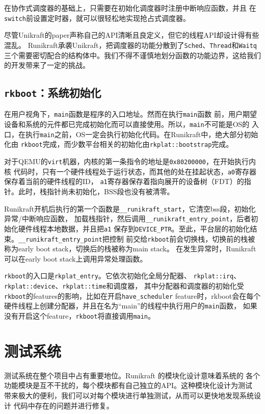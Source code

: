 \documentclass{../runikraft-report}
\begin{document}
在协作式调度器的基础上，只需要在初始化调度器时注册中断响应函数，并且
在\texttt{switch}前设置定时器，就可以很轻松地实现抢占式调度器。

尽管Unikraft的paper声称自己的API清晰且良定义，但它的线程API却设计得有些混乱。
Runikraft承袭Unikraft，把调度器的功能分散到了\texttt{Sched}、\texttt{Thread}和\texttt{Waitq}
三个需要密切配合的结构体中。我们不得不谨慎地划分函数的功能边界，这给我们的开发带来了一定的挑战。

\subsection[\texttt{rkboot}]{\texttt{rkboot}：系统初始化}
在用户视角下，\texttt{main}函数是程序的入口地址。然而在执行\texttt{main}函数
前，用户期望设备和系统的元件都已完成初始化而可以直接使用。所以，\texttt{main}不可能是OS的
入口，在执行\texttt{main}之前，OS一定会执行初始化代码。在Runikraft中，绝大部分初始化由
\texttt{rkboot}完成，而少数平台相关的初始化由\texttt{rkplat::bootstrap}完成。

对于QEMU的\texttt{virt}机器，内核的第一条指令的地址是\texttt{0x80200000}，在开始执行内核
代码时，只有一个硬件线程处于运行状态，而其他的处在挂起状态，\texttt{a0}寄存器保存着当前的硬件线程的ID，
\texttt{a1}寄存器保存着指向展开的设备树（FDT）的指针。此时，栈指针尚未初始化，BSS段也没有被清零。

Runikraft开机后执行的第一个函数是\texttt{\_\_runikraft\_start}，它清空bss段，初始化异常/中断响应函数，
加载栈指针，然后调用\texttt{\_\_runikraft\_entry\_point}，后者初始化硬件线程本地数据，并且把\texttt{a1}
保存到\texttt{DEVICE\_PTR}。至此，平台层的初始化结束。\texttt{\_\_runikraft\_entry\_\linebreak point}把控制
前交给\texttt{rkboot}前会切换栈，切换前的栈被称为early boot stack，切换后的栈被称为main stack。
在发生异常时，Runikraft可以在early boot stack上调用异常处理函数。

\texttt{rkboot}的入口是\texttt{rkplat\_entry}。它依次初始化全局分配器、
\texttt{rkplat::irq}、\texttt{rkplat::\linebreak device}、\texttt{rkplat::time}和调度器，
其中分配器和调度器的初始化受\texttt{rkboot}的features的影响，比如在开启\texttt{have\_scheduler}
feature时，rkboot会在每个硬件线程上创建分配器，并且在名为“main”的线程中执行用户的\texttt{main}函数，
如果没有开启这个feature，\texttt{rkboot}将直接调用\texttt{main}。

\section{测试系统}
测试系统在整个项目中占有重要地位。Runikraft 的模块化设计意味着系统的
各个功能模块是互不干扰的，每个模块都有自己独立的API。这种模块化设计为测试
带来极大的便利，我们可以对每个模块进行单独测试，从而可以更快地发现系统设计
代码中存在的问题并进行修复。
\end{document}
